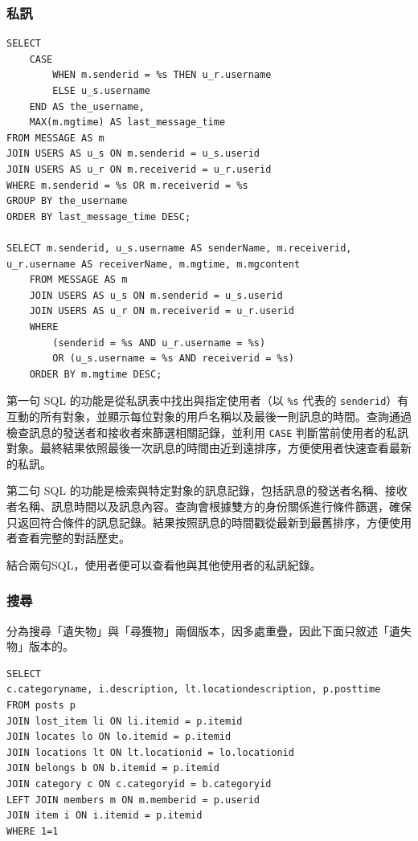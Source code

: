 \documentclass[12pt,a4paper]{article}
\begin{document}
\subsubsection{私訊}
\begin{lstlisting}
SELECT 
    CASE 
        WHEN m.senderid = %s THEN u_r.username
        ELSE u_s.username
    END AS the_username,
    MAX(m.mgtime) AS last_message_time
FROM MESSAGE AS m
JOIN USERS AS u_s ON m.senderid = u_s.userid
JOIN USERS AS u_r ON m.receiverid = u_r.userid
WHERE m.senderid = %s OR m.receiverid = %s
GROUP BY the_username
ORDER BY last_message_time DESC;

SELECT m.senderid, u_s.username AS senderName, m.receiverid, u_r.username AS receiverName, m.mgtime, m.mgcontent
    FROM MESSAGE AS m
    JOIN USERS AS u_s ON m.senderid = u_s.userid
    JOIN USERS AS u_r ON m.receiverid = u_r.userid
    WHERE 
        (senderid = %s AND u_r.username = %s) 
        OR (u_s.username = %s AND receiverid = %s)
    ORDER BY m.mgtime DESC;
\end{lstlisting}

第一句 SQL 的功能是從私訊表中找出與指定使用者（以 \texttt{\%s} 代表的 \texttt{senderid}）有互動的所有對象，並顯示每位對象的用戶名稱以及最後一則訊息的時間。查詢通過檢查訊息的發送者和接收者來篩選相關記錄，並利用 \texttt{CASE} 判斷當前使用者的私訊對象。最終結果依照最後一次訊息的時間由近到遠排序，方便使用者快速查看最新的私訊。

第二句 SQL 的功能是檢索與特定對象的訊息記錄，包括訊息的發送者名稱、接收者名稱、訊息時間以及訊息內容。查詢會根據雙方的身份關係進行條件篩選，確保只返回符合條件的訊息記錄。結果按照訊息的時間戳從最新到最舊排序，方便使用者查看完整的對話歷史。

結合兩句SQL，使用者便可以查看他與其他使用者的私訊紀錄。

\subsubsection{搜尋}
分為搜尋「遺失物」與「尋獲物」兩個版本，因多處重疊，因此下面只敘述「遺失物」版本的。
\begin{lstlisting}
SELECT         
c.categoryname, i.description, lt.locationdescription, p.posttime
FROM posts p
JOIN lost_item li ON li.itemid = p.itemid
JOIN locates lo ON lo.itemid = p.itemid
JOIN locations lt ON lt.locationid = lo.locationid
JOIN belongs b ON b.itemid = p.itemid
JOIN category c ON c.categoryid = b.categoryid
LEFT JOIN members m ON m.memberid = p.userid
JOIN item i ON i.itemid = p.itemid
WHERE 1=1
\end{lstlisting}
\end{document}
